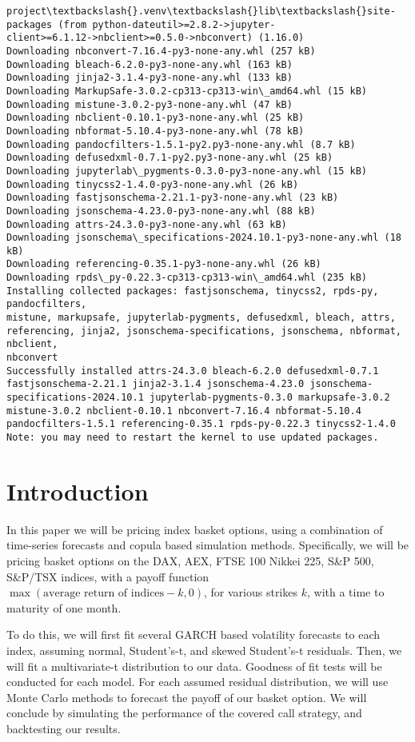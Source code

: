 \documentclass[11pt]{article}
\begin{document}
\begin{Verbatim}[commandchars=\\\{\}]
project\textbackslash{}.venv\textbackslash{}lib\textbackslash{}site-packages (from python-dateutil>=2.8.2->jupyter-
client>=6.1.12->nbclient>=0.5.0->nbconvert) (1.16.0)
Downloading nbconvert-7.16.4-py3-none-any.whl (257 kB)
Downloading bleach-6.2.0-py3-none-any.whl (163 kB)
Downloading jinja2-3.1.4-py3-none-any.whl (133 kB)
Downloading MarkupSafe-3.0.2-cp313-cp313-win\_amd64.whl (15 kB)
Downloading mistune-3.0.2-py3-none-any.whl (47 kB)
Downloading nbclient-0.10.1-py3-none-any.whl (25 kB)
Downloading nbformat-5.10.4-py3-none-any.whl (78 kB)
Downloading pandocfilters-1.5.1-py2.py3-none-any.whl (8.7 kB)
Downloading defusedxml-0.7.1-py2.py3-none-any.whl (25 kB)
Downloading jupyterlab\_pygments-0.3.0-py3-none-any.whl (15 kB)
Downloading tinycss2-1.4.0-py3-none-any.whl (26 kB)
Downloading fastjsonschema-2.21.1-py3-none-any.whl (23 kB)
Downloading jsonschema-4.23.0-py3-none-any.whl (88 kB)
Downloading attrs-24.3.0-py3-none-any.whl (63 kB)
Downloading jsonschema\_specifications-2024.10.1-py3-none-any.whl (18 kB)
Downloading referencing-0.35.1-py3-none-any.whl (26 kB)
Downloading rpds\_py-0.22.3-cp313-cp313-win\_amd64.whl (235 kB)
Installing collected packages: fastjsonschema, tinycss2, rpds-py, pandocfilters,
mistune, markupsafe, jupyterlab-pygments, defusedxml, bleach, attrs,
referencing, jinja2, jsonschema-specifications, jsonschema, nbformat, nbclient,
nbconvert
Successfully installed attrs-24.3.0 bleach-6.2.0 defusedxml-0.7.1
fastjsonschema-2.21.1 jinja2-3.1.4 jsonschema-4.23.0 jsonschema-
specifications-2024.10.1 jupyterlab-pygments-0.3.0 markupsafe-3.0.2
mistune-3.0.2 nbclient-0.10.1 nbconvert-7.16.4 nbformat-5.10.4
pandocfilters-1.5.1 referencing-0.35.1 rpds-py-0.22.3 tinycss2-1.4.0
Note: you may need to restart the kernel to use updated packages.
    \end{Verbatim}

    \section{Introduction}\label{introduction}

In this paper we will be pricing index basket options, using a
combination of time-series forecasts and copula based simulation
methods. Specifically, we will be pricing basket options on the DAX,
AEX, FTSE 100 Nikkei 225, S\&P 500, S\&P/TSX indices, with a payoff
function \(\max{(\text{average return of indices}-k, 0)}\), for various
strikes \(k\), with a time to maturity of one month.

To do this, we will first fit several GARCH based volatility forecasts
to each index, assuming normal, Student's-t, and skewed Student's-t
residuals. Then, we will fit a multivariate-t distribution to our data.
Goodness of fit tests will be conducted for each model. For each assumed
residual distribution, we will use Monte Carlo methods to forecast the
payoff of our basket option. We will conclude by simulating the
performance of the covered call strategy, and backtesting our results.
\end{document}
